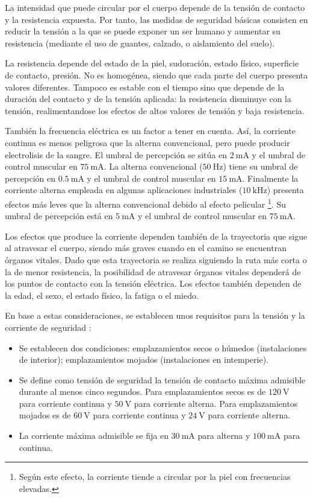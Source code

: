 La intensidad que puede circular por el cuerpo depende de la tensión
de contacto y la resistencia expuesta. Por tanto, las medidas de seguridad
básicas consisten en reducir la tensión a la que se puede exponer
un ser humano y aumentar su resistencia (mediante el uso de guantes,
calzado, o aislamiento del suelo). 

La resistencia depende del estado de la piel, sudoración, estado físico,
superficie de contacto, presión. No es homogénea, siendo que cada
parte del cuerpo presenta valores diferentes. Tampoco es estable con
el tiempo sino que depende de la duración del contacto y de la tensión
aplicada: la resistencia disminuye con la tensión, realimentandose
los efectos de altos valores de tensión y baja resistencia. 

También la frecuencia eléctrica es un factor a tener en cuenta. Así,
la corriente continua es menos peligrosa que la alterna convencional,
pero puede producir electrolisis de la sangre. El umbral de percepción
se sitúa en $\SI{2}{\milli\ampere}$ y el umbral de control muscular
en $\SI{75}{\milli\ampere}$. La alterna convencional ($\SI{50}{\hertz}$)
tiene su umbral de percepción en $\SI{0.5}{\milli\ampere}$ y el umbral
de control muscular en $\SI{15}{\milli\ampere}$. Finalmente la corriente
alterna empleada en algunas aplicaciones industriales ($\SI{10}{\kilo\hertz}$)
presenta efectos más leves que la alterna convencional debido al efecto
pelicular%
\footnote{Según este efecto, la corriente tiende a circular por la piel con
frecuencias elevadas.%
}. Su umbral de percepción está en $\SI{5}{\milli\ampere}$ y el umbral
de control muscular en $\SI{75}{\milli\ampere}$.

Los efectos que produce la corriente dependen también de la trayectoria
que sigue al atravesar el cuerpo, siendo más graves cuando en el camino
se encuentran órganos vitales. Dado que esta trayectoria se realiza
siguiendo la ruta más corta o la de menor resistencia, la posibilidad
de atravesar órganos vitales dependerá de los puntos de contacto con
la tensión eléctrica. Los efectos también dependen de la edad, el
sexo, el estado físico, la fatiga o el miedo. 

En base a estas consideraciones, se establecen unos requisitos para
la tensión y la corriente de seguridad \cite{RD_842_2002,Gomez-Vidal2000,MestreRovira2002,PerezGabarda2000}: 
\begin{itemize}
\item Se establecen dos condiciones: emplazamientos secos o húmedos (instalaciones
de interior); emplazamientos mojados (instalaciones en intemperie).
\item Se define como tensión de seguridad la tensión de contacto máxima
admisible durante al menos cinco segundos. Para emplazamientos secos
es de $\SI{120}{\volt}$ para corriente continua y $\SI{50}{\volt}$
para corriente alterna. Para emplazamientos mojados es de $\SI{60}{\volt}$
para corriente continua y $\SI{24}{\volt}$ para corriente alterna.
\item La corriente máxima admisible se fija en $\SI{30}{\milli\ampere}$
para alterna y $\SI{100}{\milli\ampere}$ para continua.
\end{itemize}

